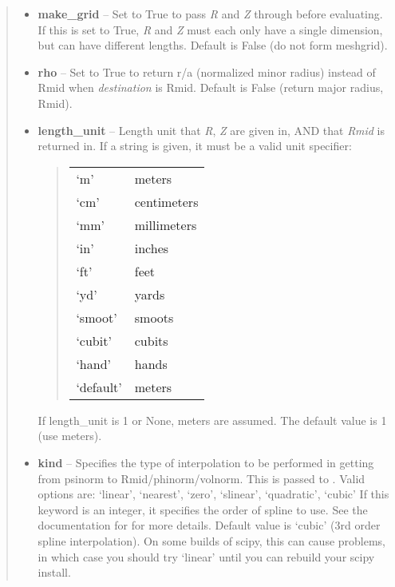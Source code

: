 \documentclass[letterpaper,10pt,english]{sphinxmanual}
\begin{document}
\begin{fulllineitems}
\begin{fulllineitems}
\begin{quote}
\begin{description}
\begin{itemize}
\item {} 
\textbf{make\_grid} -- Set to True to pass \emph{R} and \emph{Z} through
 before evaluating. If this is set to
True, \emph{R} and \emph{Z} must each only have a single dimension, but
can have different lengths. Default is False (do not form
meshgrid).

\item {} 
\textbf{rho} -- Set to True to return r/a (normalized minor radius)
instead of Rmid when \emph{destination} is Rmid. Default is False
(return major radius, Rmid).

\item {} 
\textbf{length\_unit} -- 
Length unit that \emph{R}, \emph{Z} are given in,
AND that \emph{Rmid} is returned in. If a string is given, it must
be a valid unit specifier:
\begin{quote}

\begin{tabulary}{\linewidth}{|L|L|}
\hline

`m'
 & 
meters
\\

`cm'
 & 
centimeters
\\

`mm'
 & 
millimeters
\\

`in'
 & 
inches
\\

`ft'
 & 
feet
\\

`yd'
 & 
yards
\\

`smoot'
 & 
smoots
\\

`cubit'
 & 
cubits
\\

`hand'
 & 
hands
\\

`default'
 & 
meters
\\
\hline\end{tabulary}

\end{quote}

If length\_unit is 1 or None, meters are assumed. The default
value is 1 (use meters).


\item {} 
\textbf{kind} -- Specifies the type of
interpolation to be performed in getting from psinorm to
Rmid/phinorm/volnorm. This is passed to
. Valid options are:
`linear', `nearest', `zero', `slinear', `quadratic', `cubic'
If this keyword is an integer, it specifies the order of spline
to use. See the documentation for  for more
details. Default value is `cubic' (3rd order spline
interpolation). On some builds of scipy, this can cause problems,
in which case you should try `linear' until you can rebuild your
scipy install.


\end{itemize}
\end{description}
\end{quote}
\end{fulllineitems}
\end{fulllineitems}
\end{document}
